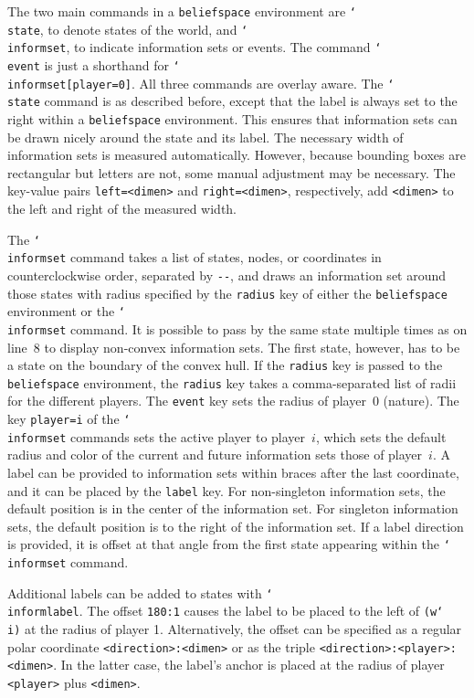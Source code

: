 \documentclass{article}
\renewcommand{\textbackslash}{\char`\\}
\def\cmd#1{\texttt{\color{cmd}\textbackslash#1}}
\def\optarg[#1]{{\color{player1}[#1]}}
\def\largeskip{\vskip9pt plus 3pt minus 3pt}
\begin{document}
The two main commands in a \texttt{beliefspace} environment are \cmd{state}, to denote states of the world, and \cmd{informset}, to indicate information sets or events. The command \cmd{event} is just a shorthand for \cmd{informset\optarg[player=0]}. All three commands are overlay aware. The \cmd{state} command is as described before, except that the label is always set to the right within a \texttt{beliefspace} environment. This ensures that information sets can be drawn nicely around the state and its label. The necessary width of information sets is measured automatically. However, because bounding boxes are rectangular but letters are not, some manual adjustment may be necessary. The key-value pairs \texttt{left=<dimen>} and \texttt{right=<dimen>}, respectively, add \texttt{<dimen>} to the left and right of the measured width.

The \cmd{informset} command takes a list of states, nodes, or coordinates in counterclockwise order, separated by \verb|--|, and draws an information set around those states with radius specified by the \texttt{radius} key of either the \texttt{beliefspace} environment or the \cmd{informset} command. It is possible to pass by the same state multiple times as on line~8 to display non-convex information sets. The first state, however, has to be a state on the boundary of the convex hull. If the \texttt{radius} key is passed to the \texttt{beliefspace} environment, the \texttt{radius} key takes a comma-separated list of radii for the different players. The \texttt{event} key sets the radius of player~0 (nature). The key \texttt{player=i} of the \cmd{informset} commands sets the active player to player~$i$, which sets the default radius and color of the current and future information sets those of player~$i$. A label can be provided to information sets within braces after the last coordinate, and it can be placed by the \texttt{label} key. For non-singleton information sets, the default position is in the center of the information set. For singleton information sets, the default position is to the right of the information set. If a label direction is provided, it is offset at that angle from the first state appearing within the \cmd{informset} command.


Additional labels can be added to states with \cmd{informlabel}. The offset \texttt{180:1} causes the label to be placed to the left of \texttt{(w\cmd{i})} at the radius of player 1. Alternatively, the offset can be specified as a regular polar coordinate \texttt{<direction>:<dimen>} or as the triple \texttt{<direction>:<player>:<dimen>}. In the latter case, the label's anchor is placed at the radius of player \texttt{<player>} plus \texttt{<dimen>}.\largeskip
\end{document}
